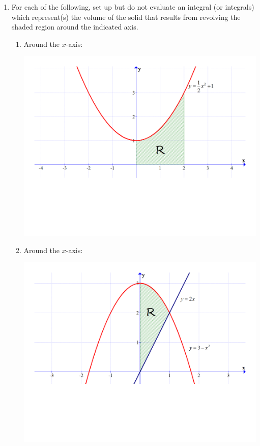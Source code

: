 \documentclass[12pt]{article}
\newif\ifans
\begin{document}
\begin{enumerate}

\item For each of the following, set up but do not evaluate an integral (or integrals) which represent(s) the volume of the solid that results from revolving the shaded region around the indicated axis.

\begin{enumerate}

\item Around the $x$-axis:

\begin{center}

\includegraphics[scale=0.5]{graph1.pdf}

\end{center}

\ifans{\fbox{$\pi\int_0^2 \left(\frac{1}{2}x^2+1\right)^2 \,dx$}} \fi

\newpage

\item Around the $x$-axis:

\begin{center}

\includegraphics[scale=0.4]{graph2.pdf}


\end{center}
\end{enumerate}
\end{enumerate}
\end{document}
